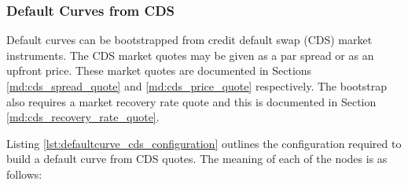 \subsubsection{Default Curves from CDS}

Default curves can be bootstrapped from credit default swap (CDS) market instruments. The CDS market quotes may be given as a par spread or as an upfront price. These market quotes are documented in Sections \ref{md:cds_spread_quote} and \ref{md:cds_price_quote} respectively. The bootstrap also requires a market recovery rate quote and this is documented in Section \ref{md:cds_recovery_rate_quote}.

Listing \ref{lst:defaultcurve_cds_configuration} outlines the configuration required to build a default curve from CDS quotes. The meaning of each of the nodes is as follows:

